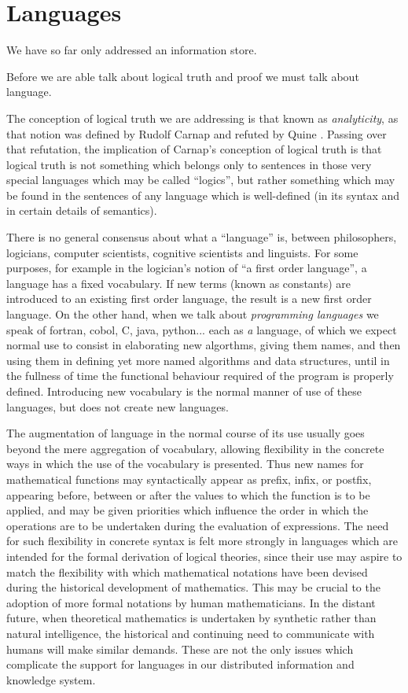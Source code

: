 \documentclass[10pt,titlepage]{article}
\begin{document}
\section{Languages}

We have so far only addressed an information store.

Before we are able talk about logical truth and proof we must talk about language.

The conception of logical truth we are addressing is that known as \emph{analyticity}, as that notion was defined by Rudolf Carnap \cite{carnap47,schilpp63} and refuted by Quine \cite{quine51b,quine61a}.
Passing over that refutation, the implication of Carnap's conception of logical truth  is that logical truth is not something which belongs only to sentences in those very special languages which may be called ``logics'', but rather something which may be found in the sentences of any language which is well-defined (in its syntax and in certain details of semantics).

There is no general consensus about what a ``language'' is, between philosophers, logicians, computer scientists, cognitive scientists and linguists.
For some purposes, for example in the logician's notion of ``a first order language'', a language has a fixed vocabulary.
If new terms (known as constants) are introduced to an existing first order language, the result is a new first order language.
On the other hand, when we talk about \emph{programming languages} we speak of fortran, cobol, C, java, python... each as \emph{a} language, of which we expect normal use to consist in elaborating new algorthms, giving them names, and then using them in defining yet more named  algorithms and data structures, until in the fullness of time the functional behaviour required of the program is properly defined.
Introducing new vocabulary is the normal manner of use of these languages, but does not create new languages.

The augmentation of language in the normal course of its use usually goes beyond the mere aggregation of vocabulary, allowing flexibility in the concrete ways in which the use of the vocabulary is presented.
Thus new names for mathematical functions may syntactically appear as prefix, infix, or postfix, appearing before, between or after the values to which the function is to be applied, and may be given priorities which influence the order in which the operations are to be undertaken during the evaluation of expressions.
The need for such flexibility in concrete syntax is felt more strongly in languages which are intended for the formal derivation of logical theories, since their use may aspire to match the flexibility with which mathematical notations have been devised during the historical development of mathematics.
This may be crucial to the adoption of more formal notations by human mathematicians.
In the distant future, when theoretical mathematics is undertaken by synthetic rather than natural intelligence, the historical and continuing need to communicate with humans will make similar demands.
These are not the only issues which complicate the support for languages in our distributed information and knowledge system.
\end{document}
